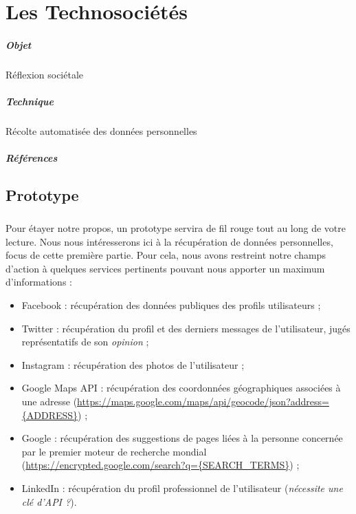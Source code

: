 \chapter{Les Technosociétés}
\paragraph{Objet} Réflexion sociétale
\paragraph{Technique} Récolte automatisée des données personnelles
\paragraph{Références}
\cite{Damasio0}
\cite{Damasio1}
\cite{Damasio2}
\cite{Deleuze0}
\cite{Foucault0}
\cite{Huxley0}
\cite{Klein0}
\cite{Marx0}
\cite{Marx1}
\cite{Moore0}
\cite{Negri0}
\cite{Nietzsche0}
\cite{Orwell0}
\cite{Pieces0}
\cite{Rabhi0}
\cite{Rabhi1}
\cite{Rufin0}
\cite{Arte0}
\cite{GhostInTheShell}
\cite{Gunnm}
\cite{PsychoPass}

\section*{Prototype}

\paragraph{} Pour étayer notre propos, un prototype servira de fil rouge tout au
long de votre lecture. Nous nous intéresserons ici à la récupération de données personnelles,
focus de cette première partie. Pour cela, nous avons restreint notre champs d'action à quelques
services pertinents pouvant nous apporter un maximum d'informations :

\begin{itemize}
    \item Facebook : récupération des données publiques des profils utilisateurs ;
    \item Twitter : récupération du profil et des derniers messages de l'utilisateur, jugés
    représentatifs de son \emph{opinion} ;
    \item Instagram : récupération des photos de l'utilisateur ; 
    \item Google Maps API : récupération des coordonnées géographiques associées à une adresse
    (\url{https://maps.google.com/maps/api/geocode/json?address={ADDRESS}}) ;
    \item Google : récupération des suggestions de pages liées à la personne concernée par le
    premier moteur de recherche mondial (\url{https://encrypted.google.com/search?q={SEARCH_TERMS}}) ;
    \item LinkedIn : récupération du profil professionnel de l'utilisateur (\emph{nécessite une clé d'API ?}).
\end{itemize}

